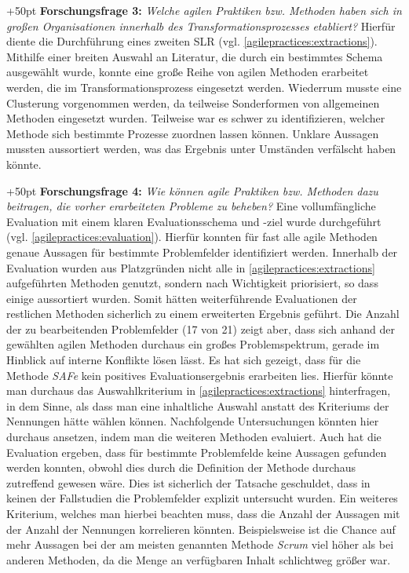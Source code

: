 \hangindent+50pt 
\textbf{Forschungsfrage 3:} \textit{Welche agilen Praktiken bzw. Methoden haben sich in großen Organisationen innerhalb des Transformationsprozesses etabliert?
} Hierfür diente die Durchführung eines zweiten SLR (vgl. \ref{agilepractices:extractions}). Mithilfe einer breiten Auswahl an Literatur, die durch ein bestimmtes Schema ausgewählt wurde, konnte eine große Reihe von agilen Methoden erarbeitet werden, die im Transformationsprozess eingesetzt werden. Wiederrum musste eine Clusterung vorgenommen werden, da teilweise Sonderformen von allgemeinen Methoden eingesetzt wurden. Teilweise war es schwer zu identifizieren, welcher Methode sich bestimmte Prozesse zuordnen lassen können. Unklare Aussagen mussten aussortiert werden, was das Ergebnis unter Umständen verfälscht haben könnte.

\hangindent+50pt 
\textbf{Forschungsfrage 4:} \textit{Wie können agile Praktiken bzw. Methoden dazu beitragen, die vorher erarbeiteten Probleme zu beheben?} Eine vollumfängliche Evaluation mit einem klaren Evaluationsschema und -ziel wurde durchgeführt (vgl. \ref{agilepractices:evaluation}). Hierfür konnten für fast alle agile Methoden genaue Aussagen für bestimmte Problemfelder identifiziert werden. Innerhalb der Evaluation wurden aus Platzgründen nicht alle in \ref{agilepractices:extractions} aufgeführten Methoden genutzt, sondern nach Wichtigkeit priorisiert, so dass einige aussortiert wurden. Somit hätten weiterführende Evaluationen der restlichen Methoden sicherlich zu einem erweiterten Ergebnis geführt. Die Anzahl der zu bearbeitenden Problemfelder (17 von 21) zeigt aber, dass sich anhand der gewählten agilen Methoden durchaus ein großes Problemspektrum, gerade im Hinblick auf interne Konflikte lösen lässt. Es hat sich gezeigt, dass für die Methode \textit{SAFe} kein positives Evaluationsergebnis erarbeiten lies. Hierfür könnte man durchaus das Auswahlkriterium in \ref{agilepractices:extractions} hinterfragen, in dem Sinne, als dass man eine inhaltliche Auswahl anstatt des Kriteriums der Nennungen hätte wählen können. Nachfolgende Untersuchungen könnten hier durchaus ansetzen, indem man die weiteren Methoden evaluiert. Auch hat die Evaluation ergeben, dass für bestimmte Problemfelde keine Aussagen gefunden werden konnten, obwohl dies durch die Definition der Methode durchaus zutreffend gewesen wäre. Dies ist sicherlich der Tatsache geschuldet, dass in keinen der Fallstudien die Problemfelder explizit untersucht wurden. Ein weiteres Kriterium, welches man hierbei beachten muss, dass die Anzahl der Aussagen mit der Anzahl der Nennungen korrelieren könnten. Beispielsweise ist die Chance auf mehr Aussagen bei der am meisten genannten Methode  \textit{Scrum} viel höher als bei anderen Methoden, da die Menge an verfügbaren Inhalt schlichtweg größer war. 

